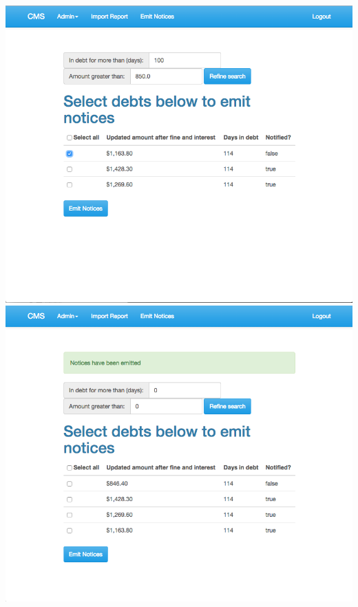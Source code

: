 \begin{itemize}
    \includegraphics[scale=0.25]{./images/ss/notice/4.png}\\
    \includegraphics[scale=0.25]{./images/ss/notice/5.png}
\end{itemize}
